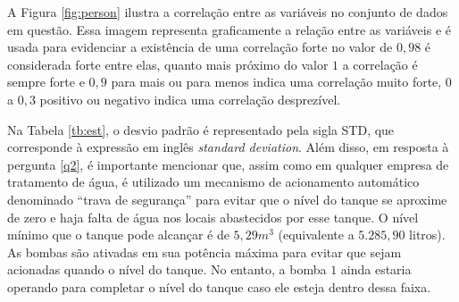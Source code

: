 A Figura \ref{fig:person} ilustra a correlação entre as variáveis no conjunto de dados em questão. Essa imagem representa graficamente a relação entre as variáveis e é usada para evidenciar a existência de uma correlação forte no valor de $0,98$ é considerada forte entre elas, quanto mais próximo do valor $1$ a correlação é sempre forte e $0,9$ para mais ou para menos indica uma correlação muito forte, 0 a $0,3$ positivo ou negativo indica uma correlação desprezível.


Na Tabela \ref{tb:est}, o desvio padrão é representado pela sigla STD, que corresponde à expressão em inglês \textit{standard deviation}. Além disso, em resposta à pergunta \ref{q2}, é importante mencionar que, assim como em qualquer empresa de tratamento de água, é utilizado um mecanismo de acionamento automático denominado ``trava de segurança'' para evitar que o nível do tanque se aproxime de zero e haja falta de água nos locais abastecidos por esse tanque. O nível mínimo que o tanque pode alcançar é de $5,29 m^3$ (equivalente a $5.285,90$ litros). As bombas são ativadas em sua potência máxima para evitar que sejam acionadas quando o nível do tanque. No entanto, a bomba $1$ ainda estaria operando para completar o nível do tanque caso ele esteja dentro dessa faixa.

